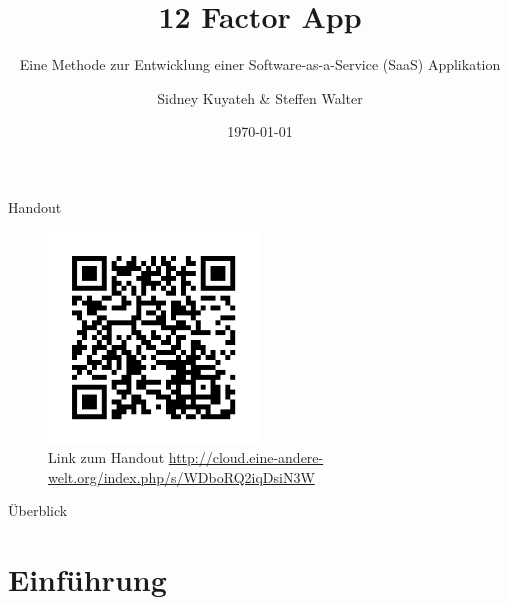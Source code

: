 \documentclass{beamer}
\title{12 Factor App}
\subtitle{Eine Methode zur Entwicklung einer Software-as-a-Service (SaaS) Applikation}
\author{Sidney Kuyateh \& Steffen Walter}
\institute{Duale Hochschule Baden-Württemberg}
\date{\today}
\begin{document}
	\maketitle
	\begin{frame}{Handout}
		\begin{figure}
			\includegraphics[width=0.5\textwidth]{frame.png}
			\caption{Link zum Handout \url{http://cloud.eine-andere-welt.org/index.php/s/WDboRQ2iqDsiN3W}}
		\end{figure}
	\end{frame}
	\begin{frame}{Überblick}
		\scriptsize
		\setlength{\baselineskip}{7pt}
		\vspace{0.3cm}
		\tableofcontents
		\vfill
	\end{frame}
		\section{Einführung}
\end{document}

